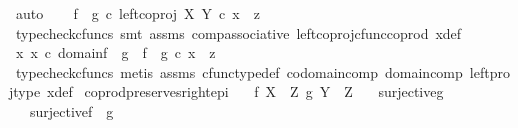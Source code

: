 \begin{isabellebody}
\ auto\isanewline
\ \ \isamarkupfalse%
\ {\isachardoublequoteopen}{\isacharparenleft}{\kern0pt}f\ {\isasymamalg}\ g{\isacharparenright}{\kern0pt}\ {\isasymcirc}\isactrlsub c\ {\isacharparenleft}{\kern0pt}left{\isacharunderscore}{\kern0pt}coproj\ X\ Y\ {\isasymcirc}\isactrlsub c\ x{\isacharparenright}{\kern0pt}\ {\isacharequal}{\kern0pt}\ z{\isachardoublequoteclose}\isanewline
\ \ \ \ \isamarkupfalse%
\ {\isacharparenleft}{\kern0pt}typecheck{\isacharunderscore}{\kern0pt}cfuncs{\isacharcomma}{\kern0pt}\ smt\ assms\ comp{\isacharunderscore}{\kern0pt}associative{}\ left{\isacharunderscore}{\kern0pt}coproj{\isacharunderscore}{\kern0pt}cfunc{\isacharunderscore}{\kern0pt}coprod\ x{\isacharunderscore}{\kern0pt}def{\isacharparenright}{\kern0pt}\isanewline
\ \ \isamarkupfalse%
\ \isamarkupfalse%
\ {\isachardoublequoteopen}{\isasymexists}x{\isachardot}{\kern0pt}\ x\ {\isasymin}\isactrlsub c\ domain{\isacharparenleft}{\kern0pt}f\ {\isasymamalg}\ g{\isacharparenright}{\kern0pt}\ {\isasymand}\ f\ {\isasymamalg}\ g\ {\isasymcirc}\isactrlsub c\ x\ {\isacharequal}{\kern0pt}\ z{\isachardoublequoteclose}\isanewline
\ \ \ \ \isamarkupfalse%
\ {\isacharparenleft}{\kern0pt}typecheck{\isacharunderscore}{\kern0pt}cfuncs{\isacharcomma}{\kern0pt}\ metis\ assms{\isacharparenleft}{\kern0pt}{}{\isacharcomma}{\kern0pt}{}{\isacharparenright}{\kern0pt}\ cfunc{\isacharunderscore}{\kern0pt}type{\isacharunderscore}{\kern0pt}def\ codomain{\isacharunderscore}{\kern0pt}comp\ domain{\isacharunderscore}{\kern0pt}comp\ left{\isacharunderscore}{\kern0pt}proj{\isacharunderscore}{\kern0pt}type\ x{\isacharunderscore}{\kern0pt}def{\isacharparenright}{\kern0pt}\isanewline
{}\isamarkupfalse%
%
\endisatagproof
{\isafoldproof}%
%
\isadelimproof
\isanewline
%
\endisadelimproof
\isanewline
{}\isamarkupfalse%
\ coprod{\isacharunderscore}{\kern0pt}preserves{\isacharunderscore}{\kern0pt}right{\isacharunderscore}{\kern0pt}epi{\isacharcolon}{\kern0pt}\isanewline
\ \ \ {\isachardoublequoteopen}f{\isacharcolon}{\kern0pt}\ X\ {\isasymrightarrow}\ Z{\isachardoublequoteclose}\ {\isachardoublequoteopen}g{\isacharcolon}{\kern0pt}\ Y\ {\isasymrightarrow}\ Z{\isachardoublequoteclose}\isanewline
\ \ \ {\isachardoublequoteopen}surjective{\isacharparenleft}{\kern0pt}g{\isacharparenright}{\kern0pt}{\isachardoublequoteclose}\isanewline
\ \ \ {\isachardoublequoteopen}surjective{\isacharparenleft}{\kern0pt}f\ {\isasymamalg}\ g{\isacharparenright}{\kern0pt}{\isachardoublequoteclose}\isanewline

\end{isabellebody}
